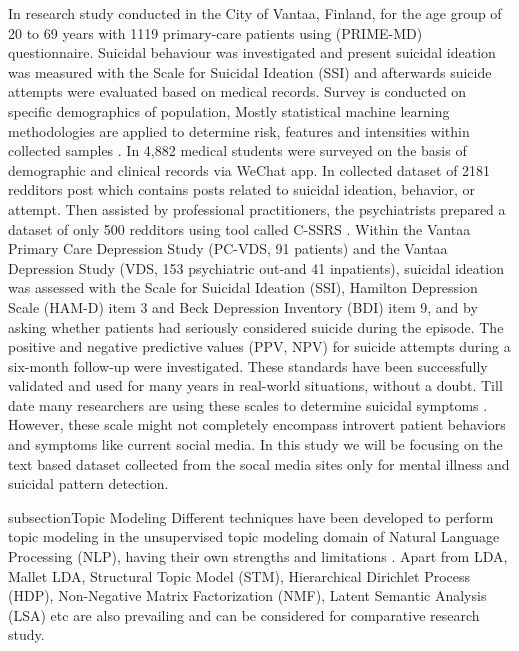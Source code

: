 \documentclass[sn-mathphys,Numbered]{sn-jnl}%
\theoremstyle{thmstyleone}%
\theoremstyle{thmstyletwo}%
\theoremstyle{thmstylethree}%
\begin{document}
In \cite{vuorilehto2006suicidal} research study conducted in the City of Vantaa, Finland, for the age group of 20 to 69 years with 1119 primary-care patients using (PRIME-MD) questionnaire. Suicidal behaviour was investigated and present suicidal ideation was measured with the Scale for Suicidal Ideation (SSI) and afterwards suicide attempts were evaluated based on medical records. Survey is conducted on specific demographics of population, Mostly statistical machine learning methodologies are applied to determine risk, features and intensities within collected samples \cite{shen2020detecting}. In \cite{shen2020detecting} 4,882 medical students were surveyed on the basis of demographic and clinical records via WeChat app. In \cite{gaur2019knowledge} collected dataset of 2181 redditors post which contains posts related to suicidal ideation, behavior, or attempt. Then assisted by professional practitioners, the psychiatrists prepared a dataset of only 500 redditors using tool called C-SSRS \cite{posner2011columbia}. \cite{vuorilehto2014method} Within the Vantaa Primary Care Depression Study (PC-VDS, 91 patients) and the Vantaa Depression Study (VDS, 153 psychiatric out-and 41 inpatients), suicidal ideation was assessed with the Scale for Suicidal Ideation (SSI), Hamilton Depression Scale (HAM-D) item 3 and Beck Depression Inventory (BDI) item 9, and by asking whether patients had seriously considered suicide during the episode. The positive and negative predictive values (PPV, NPV) for suicide attempts during a six-month follow-up were investigated. These standards have been successfully validated and used for many years in real-world situations, without a doubt. Till date many researchers are using these scales to determine suicidal symptoms \cite{li2022association}. However, these scale might not completely encompass introvert patient behaviors and symptoms like current social media. In this study we will be focusing on the text based dataset collected from the socal media sites only for mental illness and suicidal pattern detection. 

subsection{Topic Modeling}
 Different techniques have been developed to perform topic modeling in the unsupervised topic modeling domain of Natural Language Processing (NLP), having their own strengths and limitations \cite{vayansky2020review, abdelrazek2022topic, yi2009comparative}. Apart from LDA, Mallet LDA, Structural Topic Model (STM), Hierarchical Dirichlet Process (HDP), Non-Negative Matrix Factorization (NMF), Latent Semantic Analysis (LSA) etc are also prevailing and can be considered for comparative research study.
\end{document}
